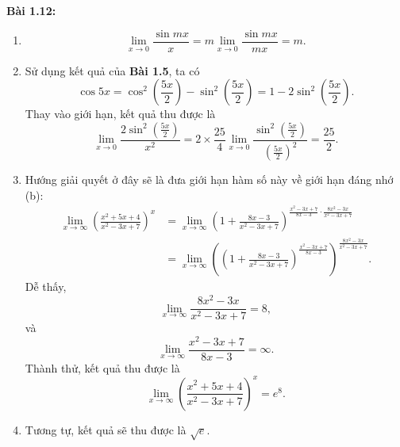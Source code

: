 \textbf{Bài 1.12:}
\begin{enumerate}[label=(\alph*)]
\item \[\lim_{x\rightarrow 0}\frac{\sin mx}{x}=m\lim_{x\rightarrow 0}\frac{\sin mx}{mx}=m.\]
\item Sử dụng kết quả của \textbf{Bài 1.5}, ta có \[\cos 5x =\cos^2 \left(\frac{5x}{2}\right)-\sin^2\left(\frac{5x}{2}\right)=1-2\sin^2\left(\frac{5x}{2}\right).\] Thay vào giới hạn, kết quả thu được là \[\lim_{x\rightarrow 0}\frac{2\sin^2\left(\frac{5x}{2}\right)}{x^2}=2\times\frac{25}{4}\lim_{x\rightarrow 0}\frac{\sin^2 \left(\frac{5x}{2}\right)}{\left(\frac{5x}{2}\right)^2}=\frac{25}{2}.\]
\item Hướng giải quyết ở đây sẽ là đưa giới hạn hàm số này về giới hạn đáng nhớ (b): 
\begin{align*}
    \lim_{x\rightarrow\infty}\left(\frac{x^2+5x+4}{x^2-3x+7}\right)^x&=\lim_{x\rightarrow\infty}\left(1+\frac{8x-3}{x^2 -3x+7}\right)^{\frac{x^2-3x+7}{8x-3}\cdot\frac{8x^2-3x}{x^2-3x+7}}\\ &=
\lim_{x\rightarrow\infty}\left(\left(1+\frac{8x-3}{x^2 -3x+7}\right)^{\frac{x^2-3x+7}{8x-3}}\right)^{\frac{8x^2-3x}{x^2-3x+7}}.
\end{align*}
 Dễ thấy, \[\lim_{x\rightarrow\infty}\frac{8x^2-3x}{x^2-3x+7}=8,\] và \[\lim_{x\rightarrow\infty}\frac{x^2-3x+7}{8x-3}=\infty.\] Thành thử, kết quả thu được là \[\lim_{x\rightarrow\infty}\left(\frac{x^2+5x+4}{x^2-3x+7}\right)^x=e^8.\] 
\item Tương tự, kết quả sẽ thu được là \(\sqrt{e}\).
\end{enumerate}